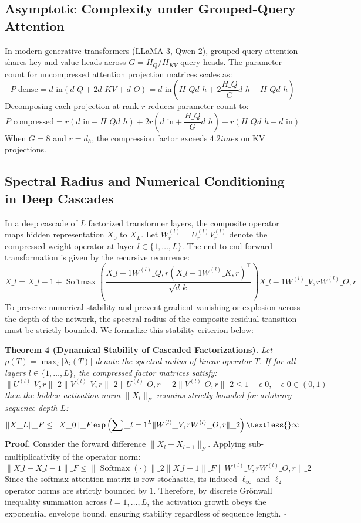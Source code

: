 \subsection*{Asymptotic Complexity under Grouped-Query Attention}
In modern generative transformers (LLaMA-3, Qwen-2), grouped-query attention shares key and value heads across $G = H_Q / H_{KV}$ query heads. The parameter count for uncompressed attention projection matrices scales as:
\[
P\_{\text{dense}} = d\_{\text{in}} \left( d\_Q + 2 d\_{KV} + d\_O \right) = d\_{\text{in}} \left( H\_Q d\_h + 2 \frac{H\_Q}{G} d\_h + H\_Q d\_h \right)
\]
Decomposing each projection at rank $r$ reduces parameter count to:
\[
P\_{\text{compressed}} = r \left( d\_{\text{in}} + H\_Q d\_h \right) + 2 r \left( d\_{\text{in}} + \frac{H\_Q}{G} d\_h \right) + r \left( H\_Q d\_h + d\_{\text{in}} \right)
\]
When $G = 8$ and $r = d_h$, the compression factor exceeds $4.2	imes$ on KV projections.

\subsection*{Spectral Radius and Numerical Conditioning in Deep Cascades}
In a deep cascade of $L$ factorized transformer layers, the composite operator maps hidden representation $X_0$ to $X_L$. Let $W^{(l)}_r = U^{(l)}_r V^{(l)}_r$ denote the compressed weight operator at layer $l \in \{1, \dots, L\}$. The end-to-end forward transformation is given by the recursive recurrence:
\[
X\_l = X\_{l-1} + \operatorname{Softmax}\left( \frac{X\_{l-1} W^{(l)}\_{Q, r} (X\_{l-1} W^{(l)}\_{K, r})^\top}{\sqrt{d\_k}} \right) X\_{l-1} W^{(l)}\_{V, r} W^{(l)}\_{O, r}
\]
To preserve numerical stability and prevent gradient vanishing or explosion across the depth of the network, the spectral radius of the composite residual transition must be strictly bounded. We formalize this stability criterion below:

\textbf{Theorem 4 (Dynamical Stability of Cascaded Factorizations).} \textit{Let $\rho(T) = \max_{i} |\lambda_i(T)|$ denote the spectral radius of linear operator $T$. If for all layers $l \in \{1, \dots, L\}$, the compressed factor matrices satisfy:}
\[
\|U^{(l)}\_{V, r}\|\_2 \|V^{(l)}\_{V, r}\|\_2 \|U^{(l)}\_{O, r}\|\_2 \|V^{(l)}\_{O, r}\|\_2 \le 1 - \epsilon\_0, \quad \epsilon\_0 \in (0, 1)
\]
\textit{then the hidden activation norm $\|X_l\|_F$ remains strictly bounded for arbitrary sequence depth $L$:}
\[
\|X\_L\|\_F \le \|X\_0\|\_F \exp\left( \sum\_{l=1}^L \|W^{(l)}\_{V, r} W^{(l)}\_{O, r}\|\_2 \right) \textless{} \infty
\]
\textbf{Proof.} Consider the forward difference $\|X_l - X_{l-1}\|_F$. Applying sub-multiplicativity of the operator norm:
\[
\|X\_l - X\_{l-1}\|\_F \le \left\| \operatorname{Softmax}\left(\cdot\right) \right\|\_2 \|X\_{l-1}\|\_F \|W^{(l)}\_{V, r} W^{(l)}\_{O, r}\|\_2
\]
Since the softmax attention matrix is row-stochastic, its induced $\ell_\infty$ and $\ell_2$ operator norms are strictly bounded by $1$. Therefore, by discrete Gr\"onwall inequality summation across $l = 1, \dots, L$, the activation growth obeys the exponential envelope bound, ensuring stability regardless of sequence length. $\square$
